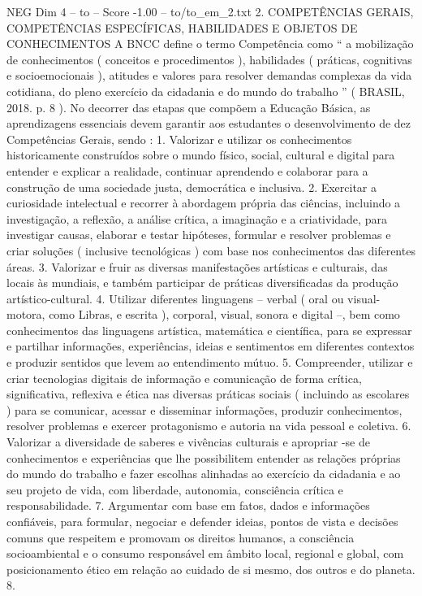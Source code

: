 \begin{textsample}{NEG Dim 4 – to – Score -1.00 – to/to\_em\_2.txt}  \label{ex:f4_neg_083}
2.
COMPETÊNCIAS GERAIS, COMPETÊNCIAS ESPECÍFICAS, HABILIDADES E OBJETOS DE CONHECIMENTOS A BNCC define o termo Competência como “ a mobilização de conhecimentos ( conceitos e procedimentos ), habilidades ( práticas, cognitivas e socioemocionais ), atitudes e valores para resolver demandas complexas da vida cotidiana, do pleno exercício da cidadania e do mundo do trabalho ” ( BRASIL, 2018. p. 8 ).
No decorrer das etapas que compõem a Educação Básica, as aprendizagens essenciais devem garantir aos estudantes o desenvolvimento de dez Competências Gerais, sendo : 1.
Valorizar e utilizar os conhecimentos historicamente construídos sobre o mundo físico, social, cultural e digital para entender e explicar a realidade, continuar aprendendo e colaborar para a construção de uma sociedade justa, democrática e inclusiva. 2.
Exercitar a curiosidade intelectual e recorrer à abordagem própria das ciências, incluindo a investigação, a reflexão, a análise crítica, a imaginação e a criatividade, para investigar causas, elaborar e testar hipóteses, formular e resolver problemas e criar soluções ( inclusive tecnológicas ) com base nos conhecimentos das diferentes áreas. 3.
Valorizar e fruir as diversas manifestações artísticas e culturais, das locais às mundiais, e também participar de práticas diversificadas da produção artístico-cultural. 4.
Utilizar diferentes linguagens – verbal ( oral ou visual-motora, como Libras, e escrita ), corporal, visual, sonora e digital –, bem como conhecimentos das linguagens artística, matemática e científica, para se expressar e partilhar informações, experiências, ideias e sentimentos em diferentes contextos e produzir sentidos que levem ao entendimento mútuo. 5.
Compreender, utilizar e criar tecnologias digitais de informação e comunicação de forma crítica, significativa, reflexiva e ética nas diversas práticas sociais ( incluindo as escolares ) para se comunicar, acessar e disseminar informações, produzir conhecimentos, resolver problemas e exercer protagonismo e autoria na vida pessoal e coletiva. 6.
Valorizar a diversidade de saberes e vivências culturais e apropriar -se de conhecimentos e experiências que lhe possibilitem entender as relações próprias do mundo do trabalho e fazer escolhas alinhadas ao exercício da cidadania e ao seu projeto de vida, com liberdade, autonomia, consciência crítica e responsabilidade. 7.
Argumentar com base em fatos, dados e informações confiáveis, para formular, negociar e defender ideias, pontos de vista e decisões comuns que respeitem e promovam os direitos humanos, a consciência socioambiental e o consumo responsável em âmbito local, regional e global, com posicionamento ético em relação ao cuidado de si mesmo, dos outros e do planeta. 8.

\end{textsample}
